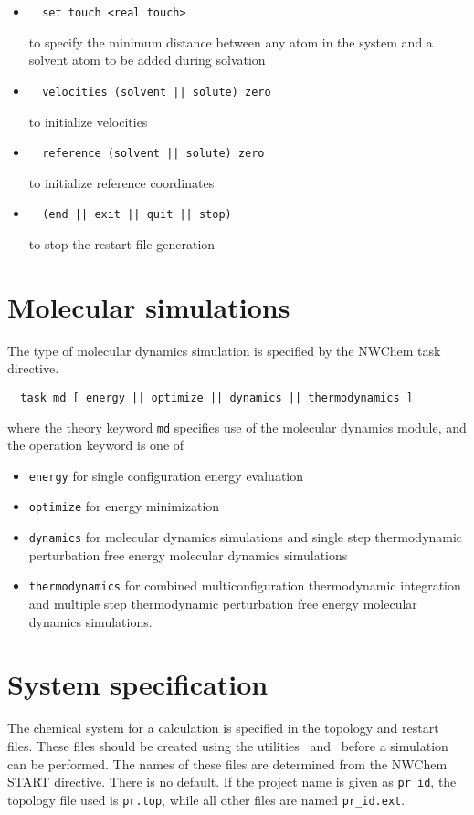 \begin{itemize}
\item
\begin{verbatim}
  set touch <real touch>
\end{verbatim}
to specify the minimum distance between any atom in
the system and a solvent atom to be added during solvation

\item
\begin{verbatim}
  velocities (solvent || solute) zero
\end{verbatim}
to initialize velocities

\item
\begin{verbatim}
  reference (solvent || solute) zero
\end{verbatim}
to initialize reference coordinates

\item
\begin{verbatim}
  (end || exit || quit || stop)
\end{verbatim}
to stop the restart file generation
\end{itemize}

\section{Molecular simulations}
The type of molecular dynamics simulation is specified by the
NWChem task directive.
\begin{verbatim}
  task md [ energy || optimize || dynamics || thermodynamics ]
\end{verbatim}
where the theory keyword {\tt md} specifies use of the molecular
dynamics module, and the operation keyword is one of
\begin{itemize}
\item
{\tt energy} for single configuration energy evaluation
\item
{\tt optimize} for energy minimization
\item
{\tt dynamics} for molecular dynamics simulations and single step
thermodynamic perturbation free energy molecular dynamics simulations
\item
{\tt thermodynamics} for combined multiconfiguration thermodynamic
integration and multiple step thermodynamic perturbation free
energy molecular dynamics simulations.
\end{itemize}

\section{System specification}
The chemical system for a calculation is specified in the topology
and restart files. These files should be created using the utilities
\nwtop\ and \nwrst\ before a simulation can be performed.
The names of these files are determined from the NWChem START directive.
There is no default. If the project name is given as {\tt pr\_id},
the topology file used is {\tt pr.top}, while all other files
are named {\tt pr\_id.ext}.

